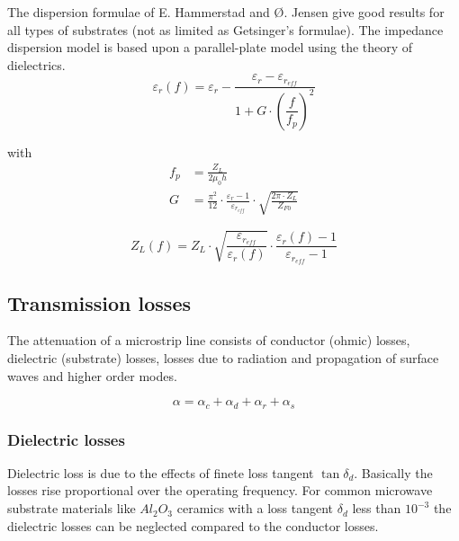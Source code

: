 \documentclass[10pt]{report}
\begin{document}
The dispersion formulae of E. Hammerstad and {\O}. Jensen
\cite{Hammerstad} give good results for all types of substrates (not
as limited as Getsinger's formulae).  The impedance dispersion model
is based upon a parallel-plate model using the theory of dielectrics.
\begin{equation}
\varepsilon_{r}(f) = \varepsilon_{r} - \frac{\varepsilon_{r} - \varepsilon_{r_{eff}}}{1 + G\cdot \left(\dfrac{f}{f_{p}}\right)^{2}}
\end{equation}

with
\begin{align}
f_{p} &= \frac{Z_{L}}{2\mu_{0} h}\\
G &= \frac{\pi^{2}}{12}\cdot\frac{\varepsilon_{r} - 1}{\varepsilon_{r_{eff}}}\cdot\sqrt{\frac{2\pi\cdot Z_{L}}{Z_{F0}}}
\end{align}

\begin{equation}
Z_{L}(f) = Z_{L}\cdot\sqrt{\frac{\varepsilon_{r_{eff}}}{\varepsilon_{r}(f)}}\cdot\frac{\varepsilon_{r}(f) - 1}{\varepsilon_{r_{eff}} - 1}
\end{equation}

\subsection{Transmission losses}

The attenuation of a microstrip line consists of conductor (ohmic)
losses, dielectric (substrate) losses, losses due to radiation and
propagation of surface waves and higher order modes.

\begin{equation}
\alpha = \alpha_c + \alpha_d + \alpha_r + \alpha_s
\end{equation}

\subsubsection{Dielectric losses}

Dielectric loss is due to the effects of finete loss tangent
$\tan{\delta_d}$. Basically the losses rise proportional over the
operating frequency.  For common microwave substrate materials like
$Al_2O_3$ ceramics with a loss tangent $\delta_d$ less than $10^{-3}$
the dielectric losses can be neglected compared to the conductor
losses.

\addvspace{12pt}
\end{document}
